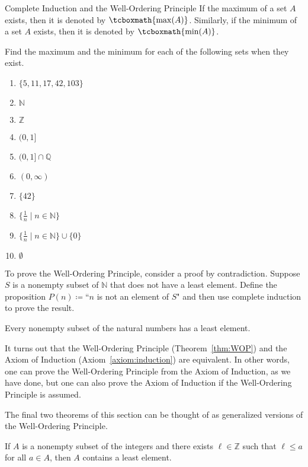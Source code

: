 \begin{section}{Complete Induction and the Well-Ordering Principle}
If the maximum of a set $A$ exists, then it is denoted by $\tcboxmath{\max(A)}$. Similarly, if the minimum of a set $A$ exists, then it is denoted by $\tcboxmath{\min(A)}$.

\begin{problem}\label{prob:find max and min}
Find the maximum and the minimum for each of the following sets when they exist.
\begin{enumerate}[label=\textrm{(\alph*)}]
\item $\{5,11,17,42,103\}$ 
\item $\mathbb{N}$
\item $\mathbb{Z}$
\item $(0,1]$
\item $(0,1]\cap \mathbb{Q}$
\item $(0,\infty)$
\item $\{42\}$
\item $\{\frac{1}{n}\mid n\in\mathbb{N}\}$
\item $\{\frac{1}{n}\mid n\in\mathbb{N}\}\cup\{0\}$
\item $\emptyset$
\end{enumerate}
\end{problem}

To prove the Well-Ordering Principle, consider a proof by contradiction. Suppose $S$ is a nonempty subset of $\mathbb{N}$ that does not have a least element.  Define the proposition $P(n)\coloneqq $``$n$ is not an element of $S$" and then use complete induction to prove the result.

\begin{theorem}\label{thm:WOP}
Every nonempty subset of the natural numbers has a least element.
\end{theorem}

It turns out that the Well-Ordering Principle (Theorem~\ref{thm:WOP}) and the Axiom of Induction (Axiom~\ref{axiom:induction}) are equivalent.  In other words, one can prove the Well-Ordering Principle from the Axiom of Induction, as we have done, but one can also prove the Axiom of Induction if the Well-Ordering Principle is assumed.

The final two theorems of this section can be thought of as generalized versions of the Well-Ordering Principle.

\begin{theorem}\label{thm:generalized WOP}
If $A$ is a nonempty subset of the integers and there exists $\ell\in \mathbb{Z}$ such that $\ell\leq a$ for all $a\in A$, then $A$ contains a least element.
\end{theorem}


\end{section}

